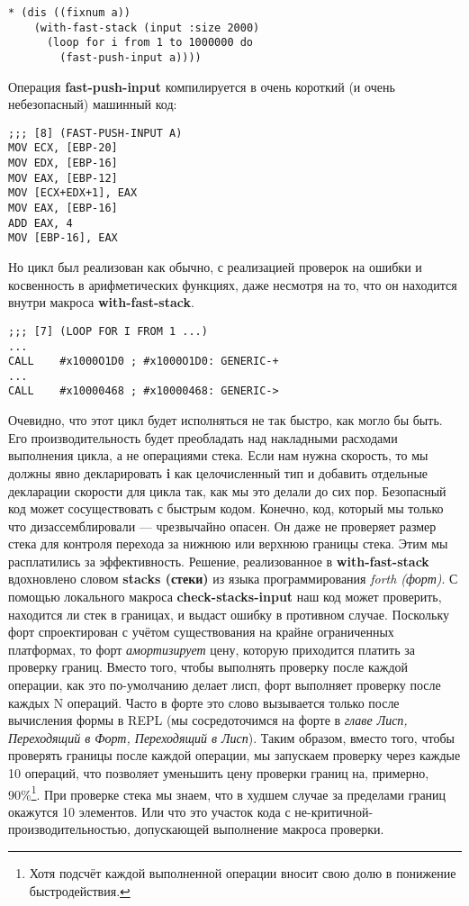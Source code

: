 \begin{verbatim}
* (dis ((fixnum a))
    (with-fast-stack (input :size 2000)
      (loop for i from 1 to 1000000 do
        (fast-push-input a))))
\end{verbatim}

Операция \textbf{fast-push-input} компилируется в очень короткий (и очень небезопасный) машинный код:

\begin{verbatim}
;;; [8] (FAST-PUSH-INPUT A)
MOV ECX, [EBP-20]
MOV EDX, [EBP-16]
MOV EAX, [EBP-12]
MOV [ECX+EDX+1], EAX
MOV EAX, [EBP-16]
ADD EAX, 4
MOV [EBP-16], EAX
\end{verbatim}

Но цикл был реализован как обычно, с реализацией проверок на ошибки и косвенность в арифметических функциях, даже несмотря на то, что он находится внутри макроса \textbf{with-fast-stack}.

\begin{verbatim}
;;; [7] (LOOP FOR I FROM 1 ...)
...
CALL    #x1000O1D0 ; #x1000O1D0: GENERIC-+
...
CALL    #x10000468 ; #x10000468: GENERIC->
\end{verbatim}

Очевидно, что этот цикл будет исполняться не так быстро, как могло бы быть. Его производительность будет преобладать над накладными расходами выполнения цикла, а не операциями стека. Если нам нужна скорость, то мы должны явно декларировать \textbf{i} как целочисленный тип и добавить отдельные декларации скорости для цикла так, как мы это делали до сих пор. Безопасный код может сосуществовать с быстрым кодом. Конечно, код, который мы только что дизассемблировали --- чрезвычайно опасен. Он даже не проверяет размер стека для контроля перехода за нижнюю или верхнюю границы стека. Этим мы расплатились за эффективность. Решение, реализованное в \textbf{with-fast-stack} вдохновлено словом \textbf{stacks (стеки)} из языка программирования \emph{forth (форт)}. С помощью локального макроса \textbf{check-stacks-input} наш код может проверить, находится ли стек в границах, и выдаст ошибку в противном случае. Поскольку форт спроектирован с учётом существования на крайне ограниченных платформах, то форт \emph{амортизирует} цену, которую приходится платить за проверку границ. Вместо того, чтобы выполнять проверку после каждой операции, как это по-умолчанию делает лисп, форт выполняет проверку после каждых N операций. Часто в форте это слово вызывается только после вычисления формы в REPL (мы сосредоточимся на форте в \emph{главе  Лисп, Переходящий в Форт, Переходящий в Лисп}). Таким образом, вместо того, чтобы проверять границы после каждой операции, мы запускаем проверку через каждые 10 операций, что позволяет уменьшить цену проверки границ на, примерно, 90\%\footnote{Хотя подсчёт каждой выполненной операции вносит свою долю в понижение быстродействия.}. При проверке стека мы знаем, что в худшем случае за пределами границ окажутся 10 элементов. Или что это участок кода с не-критичной-производительностью, допускающей выполнение макроса проверки.

